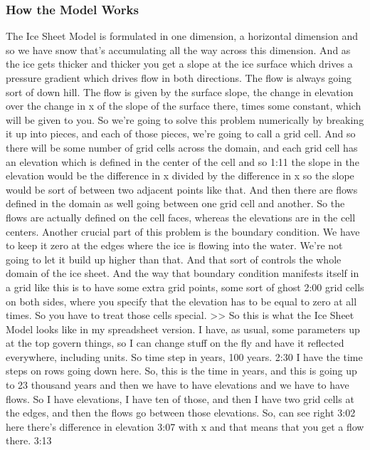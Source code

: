 \subsubsection{How the Model Works}\index{}
The Ice Sheet Model is formulated in one dimension, a horizontal dimension and so we have snow that's accumulating all the way across this dimension. And as the ice gets thicker and thicker you get a slope at the ice surface which drives a pressure gradient which drives flow in both directions. The flow is always going sort of down hill. The flow is given by the surface slope, the change in elevation over the change in x of the slope of the surface there, times some constant, which will be given to you. So we're going to solve this problem numerically by breaking it up into pieces, and each of those pieces, we're going to call a grid cell. And so there will be some number of grid cells across the domain, and each grid cell has an elevation which is defined in the center of the cell and so 
1:11
the slope in the elevation would be the difference in x divided by the difference in x so the slope would be sort of between two adjacent points like that. And then there are flows defined in the domain as well going between one grid cell and another. So the flows are actually defined on the cell faces, whereas the elevations are in the cell centers. Another crucial part of this problem is the boundary condition. We have to keep it zero at the edges where the ice is flowing into the water. We're not going to let it build up higher than that. And that sort of controls the whole domain of the ice sheet. And the way that boundary condition manifests itself in a grid like this is to have some extra grid points, some sort of ghost 
2:00
grid cells on both sides, where you specify that the elevation has to be equal to zero at all times. So you have to treat those cells special. >> So this is what the Ice Sheet Model looks like in my spreadsheet version. I have, as usual, some parameters up at the top govern things, so I can change stuff on the fly and have it reflected everywhere, including units. So time step in years, 100 years. 
2:30
I have the time steps on rows going down here. So, this is the time in years, and this is going up to 23 thousand years and then we have to have elevations and we have to have flows. So I have elevations, I have ten of those, and then I have two grid cells at the edges, and then the flows go between those elevations. So, can see right 
3:02
here there's difference in elevation 
3:07
with x and that means that you get a flow there. 
3:13
